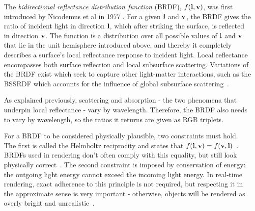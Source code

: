 The \textit{bidirectional reflectance distribution function} (BRDF), \begin{math}f(\mathbf{l}, \mathbf{v})\end{math}, was first introduced by Nicodemus et al in 1977 \cite{OriginalBRDF}. For a given \begin{math}\mathbf{l}\end{math} and \begin{math}\mathbf{v}\end{math}, the BRDF gives the ratio of incident light in direction \begin{math}\mathbf{l}\end{math}, which after striking the surface, is reflected in direction \begin{math}\mathbf{v}\end{math}. The function is a distribution over all possible values of \begin{math}\mathbf{l}\end{math} and \begin{math}\mathbf{v}\end{math} that lie in the unit hemisphere introduced above, and thereby it completely describes a surface's local reflectance response to incident light. Local reflectance encompasses both surface reflection and local subsurface scattering. Variations of the BRDF exist which seek to capture other light-matter interactions, such as the BSSRDF which accounts for the influence of global subsurface scattering~\cite{PracticalModelForSubsurfaceLightTransport}.

As explained previously, scattering and absorption - the two phenomena that underpin local reflectance - vary by wavelength. Therefore, the BRDF also needs to vary by wavelength, so the ratios it returns are given as RGB triplets.

For a BRDF to be considered physically plausible, two constraints must hold. The first is called the Helmholtz reciprocity and states that \begin{math}f(\mathbf{l}, \mathbf{v}) = f(\mathbf{v}, \mathbf{l})\end{math}~\cite{HelmholtzReciprocity}. BRDFs used in rendering don't often comply with this equality, but still look physically correct~\cite{RTR4}. The second constraint is imposed by conservation of energy: the outgoing light energy cannot exceed the incoming light energy. In real-time rendering, exact adherence to this principle is not required, but respecting it in the approximate sense is very important - otherwise, objects will be rendered as overly bright and unrealistic~\cite{RTR4}\cite{MovingFrostbitetoPBR}.

